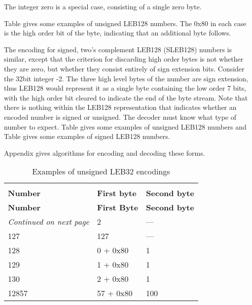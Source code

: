 The integer zero is a special case, consisting of a single
zero byte.

Table 
gives some examples of unsigned LEB128 numbers. The
0x80 in each case is the high order bit of the byte, indicating
that an additional byte follows.


The encoding for signed, two’s complement LEB128 (SLEB128)
numbers is similar, except that the criterion for discarding
high order bytes is not whether they are zero, but whether
they consist entirely of sign extension bits. Consider the
32\dash bit integer -2. The three high level bytes of the number
are sign extension, thus LEB128 would represent it as a single
byte containing the low order 7 bits, with the high order
bit cleared to indicate the end of the byte stream. Note
that there is nothing within the LEB128 representation that
indicates whether an encoded number is signed or unsigned. The
decoder must know what type of number to expect. 
Table 
gives some examples of unsigned LEB128 numbers and 
Table 
gives some examples of signed LEB128 numbers.

Appendix  
gives algorithms for encoding and decoding these forms.


\begin{centering}
\setlength{\extrarowheight}{0.1cm}
\begin{longtable}{l|l|l}
  \caption{Examples of unsigned LEB32 encodings} \label{tab:examplesofunsignedleb128encodings} \\
  \hline \\ \bfseries Number&\bfseries First byte &\bfseries Second byte \\ \hline
\endfirsthead
  \bfseries Number&\bfseries First Byte &\bfseries Second byte\\ \hline
\endhead
  \hline \emph{Continued on next page}
\endfoot
  \hline
\endlastfoot
2&2& --- \\
127&127& ---\\
128& 0 + 0x80 & 1 \\
129& 1 + 0x80 & 1 \\
130& 2 + 0x80 & 1 \\
12857& 57 + 0x80 & 100 \\

\end{longtable}
\end{centering}



